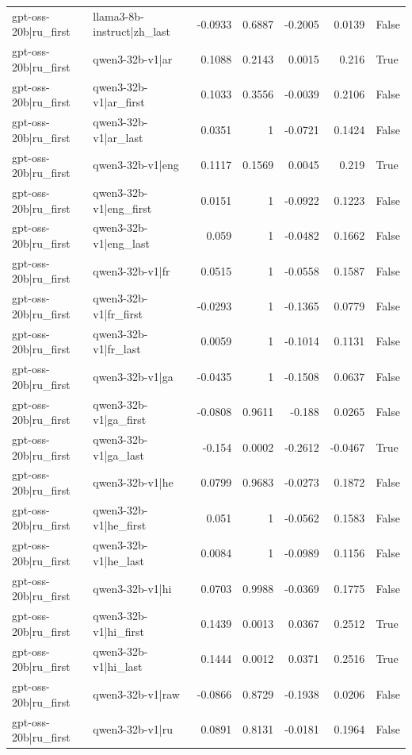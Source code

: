 \begin{table}
\begin{tabular}{l l r r r r l}
gpt-oss-20b|ru_first & llama3-8b-instruct|zh_last & -0.0933 & 0.6887 & -0.2005 & 0.0139 & False \\
gpt-oss-20b|ru_first & qwen3-32b-v1|ar & 0.1088 & 0.2143 & 0.0015 & 0.216 & True \\
gpt-oss-20b|ru_first & qwen3-32b-v1|ar_first & 0.1033 & 0.3556 & -0.0039 & 0.2106 & False \\
gpt-oss-20b|ru_first & qwen3-32b-v1|ar_last & 0.0351 & 1 & -0.0721 & 0.1424 & False \\
gpt-oss-20b|ru_first & qwen3-32b-v1|eng & 0.1117 & 0.1569 & 0.0045 & 0.219 & True \\
gpt-oss-20b|ru_first & qwen3-32b-v1|eng_first & 0.0151 & 1 & -0.0922 & 0.1223 & False \\
gpt-oss-20b|ru_first & qwen3-32b-v1|eng_last & 0.059 & 1 & -0.0482 & 0.1662 & False \\
gpt-oss-20b|ru_first & qwen3-32b-v1|fr & 0.0515 & 1 & -0.0558 & 0.1587 & False \\
gpt-oss-20b|ru_first & qwen3-32b-v1|fr_first & -0.0293 & 1 & -0.1365 & 0.0779 & False \\
gpt-oss-20b|ru_first & qwen3-32b-v1|fr_last & 0.0059 & 1 & -0.1014 & 0.1131 & False \\
gpt-oss-20b|ru_first & qwen3-32b-v1|ga & -0.0435 & 1 & -0.1508 & 0.0637 & False \\
gpt-oss-20b|ru_first & qwen3-32b-v1|ga_first & -0.0808 & 0.9611 & -0.188 & 0.0265 & False \\
gpt-oss-20b|ru_first & qwen3-32b-v1|ga_last & -0.154 & 0.0002 & -0.2612 & -0.0467 & True \\
gpt-oss-20b|ru_first & qwen3-32b-v1|he & 0.0799 & 0.9683 & -0.0273 & 0.1872 & False \\
gpt-oss-20b|ru_first & qwen3-32b-v1|he_first & 0.051 & 1 & -0.0562 & 0.1583 & False \\
gpt-oss-20b|ru_first & qwen3-32b-v1|he_last & 0.0084 & 1 & -0.0989 & 0.1156 & False \\
gpt-oss-20b|ru_first & qwen3-32b-v1|hi & 0.0703 & 0.9988 & -0.0369 & 0.1775 & False \\
gpt-oss-20b|ru_first & qwen3-32b-v1|hi_first & 0.1439 & 0.0013 & 0.0367 & 0.2512 & True \\
gpt-oss-20b|ru_first & qwen3-32b-v1|hi_last & 0.1444 & 0.0012 & 0.0371 & 0.2516 & True \\
gpt-oss-20b|ru_first & qwen3-32b-v1|raw & -0.0866 & 0.8729 & -0.1938 & 0.0206 & False \\
gpt-oss-20b|ru_first & qwen3-32b-v1|ru & 0.0891 & 0.8131 & -0.0181 & 0.1964 & False \\

\end{tabular}
\end{table}
